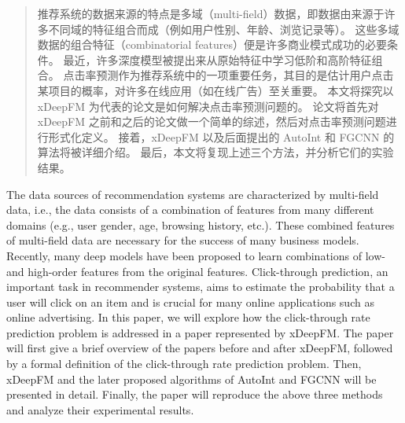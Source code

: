 \documentclass[degree=project,degree-type=project,cjk-font=noto]{thuthesis}
\begin{document}
\maketitle

\frontmatter
\begin{abstract}
  推荐系统的数据来源的特点是多域（multi-field）数据，即数据由来源于许多不同域的特征组合而成（例如用户性别、年龄、浏览记录等）。
  这些多域数据的组合特征（combinatorial features）便是许多商业模式成功的必要条件。
  最近，许多深度模型被提出来从原始特征中学习低阶和高阶特征组合。
  点击率预测作为推荐系统中的一项重要任务，其目的是估计用户点击某项目的概率，对许多在线应用（如在线广告）至关重要。
  本文将探究以 xDeepFM 为代表的论文是如何解决点击率预测问题的。
  论文将首先对 xDeepFM 之前和之后的论文做一个简单的综述，然后对点击率预测问题进行形式化定义。
  接着，xDeepFM 以及后面提出的 AutoInt 和 FGCNN 的算法将被详细介绍。
  最后，本文将复现上述三个方法，并分析它们的实验结果。

\end{abstract}

\begin{abstract*}
  The data sources of recommendation systems are characterized by multi-field data, i.e., the data consists of a combination of features from many different domains (e.g., user gender, age, browsing history, etc.).
  These combined features of multi-field data are necessary for the success of many business models.
  Recently, many deep models have been proposed to learn combinations of low- and high-order features from the original features.
  Click-through prediction, an important task in recommender systems, aims to estimate the probability that a user will click on an item and is crucial for many online applications such as online advertising.
  In this paper, we will explore how the click-through rate prediction problem is addressed in a paper represented by xDeepFM.
  The paper will first give a brief overview of the papers before and after xDeepFM, followed by a formal definition of the click-through rate prediction problem.
  Then, xDeepFM and the later proposed algorithms of AutoInt and FGCNN will be presented in detail.
  Finally, the paper will reproduce the above three methods and analyze their experimental results.

\end{abstract*}
\end{document}
